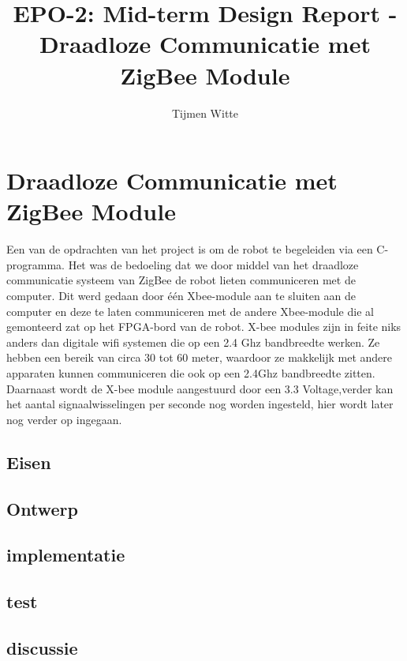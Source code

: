 \documentclass{report}
\title{EPO-2: Mid-term Design Report - Draadloze Communicatie met ZigBee Module}
\author{Tijmen Witte}
\begin{document}
\chapter{Draadloze Communicatie met ZigBee Module}
\label{ch:zigbee}
Een van de opdrachten van het project is om de robot te begeleiden via een C-programma. Het was de bedoeling dat we door middel van het draadloze communicatie systeem van ZigBee de robot lieten communiceren met de computer. Dit werd gedaan door één Xbee-module aan te sluiten aan de computer en deze te laten communiceren met de andere Xbee-module die al gemonteerd zat op het FPGA-bord van de robot.
\newline
\newline
X-bee modules zijn in feite niks anders dan digitale wifi systemen die op een 2.4 Ghz bandbreedte werken. Ze hebben een bereik van circa 30 tot 60 meter, waardoor ze makkelijk met andere apparaten kunnen communiceren die ook op een 2.4Ghz bandbreedte zitten. Daarnaast wordt de X-bee module aangestuurd door een 3.3 Voltage,verder kan het aantal signaalwisselingen per seconde nog worden ingesteld, hier wordt later nog verder op ingegaan.





\section{Eisen}

\section{Ontwerp}

\section{implementatie}

\section{test}

\section{discussie}
\end{document}
